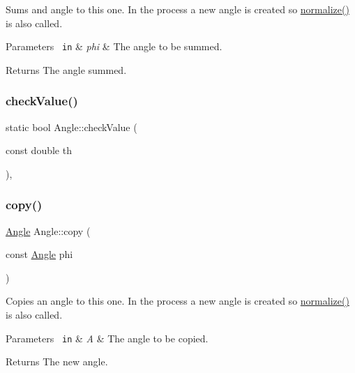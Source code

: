 Sums and angle to this one. In the process a new angle is created so {\ttfamily \mbox{\hyperlink{class_angle_a449fc0638ca2e26b4a57d1cce95788e8}{normalize()}}} is also called. 


\begin{DoxyParams}[1]{Parameters}
\mbox{\texttt{ in}}  & {\em phi} & The angle to be summed. \\
\hline
\end{DoxyParams}
\begin{DoxyReturn}{Returns}
The angle summed. 
\end{DoxyReturn}
\mbox{\label{class_angle_a5a7714013699b70d5099bd40985288f1}} 
\subsubsection{\texorpdfstring{checkValue()}{checkValue()}}
{\footnotesize\ttfamily static bool Angle\+::check\+Value (\begin{DoxyParamCaption}\item[{const double}]{th }\end{DoxyParamCaption})\hspace{0.3cm}{\ttfamily [inline]}, {\ttfamily [static]}}

\mbox{\label{class_angle_ab1c34d25d3235e639313e5d48d98a6f6}} 
\subsubsection{\texorpdfstring{copy()}{copy()}}
{\footnotesize\ttfamily \mbox{\hyperlink{class_angle}{Angle}} Angle\+::copy (\begin{DoxyParamCaption}\item[{const \mbox{\hyperlink{class_angle}{Angle}}}]{phi }\end{DoxyParamCaption})\hspace{0.3cm}{\ttfamily [inline]}}



Copies an angle to this one. In the process a new angle is created so {\ttfamily \mbox{\hyperlink{class_angle_a449fc0638ca2e26b4a57d1cce95788e8}{normalize()}}} is also called. 


\begin{DoxyParams}[1]{Parameters}
\mbox{\texttt{ in}}  & {\em A} & The angle to be copied. \\
\hline
\end{DoxyParams}
\begin{DoxyReturn}{Returns}
The new angle. 
\end{DoxyReturn}
\mbox{\label{class_angle_aedc259112dacf9197d787645f7e48911}} 
